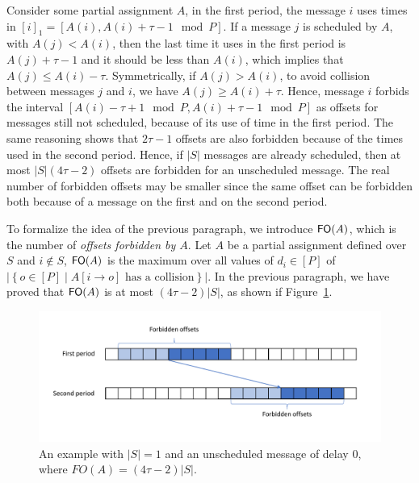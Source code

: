 \documentclass[pdflatex,sn-mathphys,iicol]{sn-jnl}%
\theoremstyle{thmstyleone}%
\theoremstyle{thmstyletwo}%
\theoremstyle{thmstylethree}%
\begin{document}
Consider some partial assignment $A$, in the first period, the message $i$ uses times in $[i]_1 = [A(i), A(i) + \tau -1 \mod P]$. If a message $j$ is scheduled by $A$, with $A(j) < A(i)$, then the last time it uses in the first period is $A(j)+\tau-1$ and it should be less than $A(i)$, which implies that $A(j) \leq A(i) - \tau$. Symmetrically, if $A(j) > A(i)$, to avoid collision between messages $j$ and $i$, we have $A(j) \geq A(i) + \tau$. Hence, message $i$ forbids the interval $[A(i) - \tau +1 \mod P, A(i) + \tau -1 \mod P]$ as offsets for messages still not scheduled, because of its use of time in the first period. The same reasoning shows that $2\tau -1$ offsets are also forbidden because of the times used in the second period. Hence, if $\lvert S\rvert $ messages are already scheduled, then at most $\lvert S\rvert(4\tau -2)$ offsets are forbidden for an unscheduled message. The real number of forbidden offsets may be smaller since the same offset can be forbidden both because of a message on the first and on the second period.

To formalize the idea of the previous paragraph, we introduce $\textsf{FO}(A)$, which is the number of \emph{offsets forbidden by $A$}. Let $A$ be a partial assignment defined over $S$ and $i\notin S$, $\textsf{FO}(A)$ is the maximum over all values of $d_i \in [P]$ of $\lvert\left\{ o \in [P] \mid A[i \rightarrow o] \text{ has a collision}\right\}\rvert$. In the previous paragraph, we have proved that $\textsf{FO}(A)$ is at most $(4 \tau -2)\lvert S\rvert$, as shown if Figure~\ref{fig:FO}. 

\begin{figure}
\begin{center}
\includegraphics[scale=0.39]{FO.pdf}
\end{center}
\caption{An example with $\lvert S\rvert = 1$ and an unscheduled message of delay $0$, where $FO(A) = (4 \tau -2)\lvert S\rvert$. }
\label{fig:FO}
\end{figure}
\end{document}
